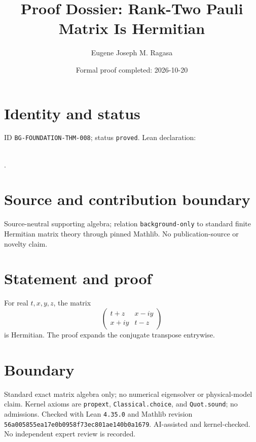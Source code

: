\documentclass[11pt]{article}
\title{Proof Dossier: Rank-Two Pauli Matrix Is Hermitian}\author{Eugene Joseph M. Ragasa}\date{Formal proof completed: 2026-10-20}
\begin{document}
\maketitle
\section{Identity and status}
ID \texttt{BG-FOUNDATION-THM-008}; status \texttt{proved}. Lean declaration:
\par{}\\
{\tiny{}}.
\section{Source and contribution boundary}
Source-neutral supporting algebra; relation \texttt{background-only} to standard finite
Hermitian matrix theory through pinned Mathlib. No publication-source or novelty claim.
\section{Statement and proof}
For real $t,x,y,z$, the matrix
\[
\begin{pmatrix}t+z&x-iy\\x+iy&t-z\end{pmatrix}
\]
is Hermitian. The proof expands the conjugate transpose entrywise.
\section{Boundary}
Standard exact matrix algebra only; no numerical eigensolver or physical-model claim.
Kernel axioms are \texttt{propext}, \texttt{Classical.choice}, and \texttt{Quot.sound}; no admissions. Checked with Lean \texttt{4.35.0} and Mathlib revision \texttt{56a005855ea17e0b0958f73ec801ae140b0a1679}. AI-assisted and kernel-checked. No independent expert review is recorded.
\end{document}
